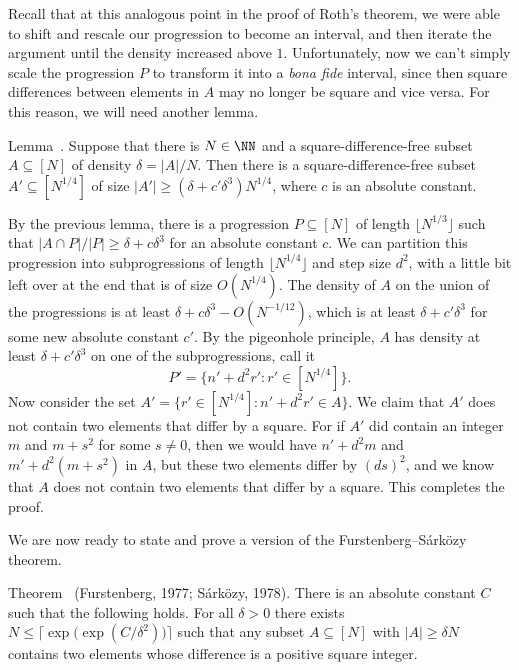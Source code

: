 Recall that at this analogous point in the proof of Roth's theorem, we were able to shift and
rescale our progression to become an interval, and then iterate the argument until the density
increased above $1$. Unfortunately,
now we can't simply scale the progression $P$ to transform it into a {\it bona fide} interval, since then
square differences between elements in $A$ may no longer be square and vice versa. For
this reason, we will need another lemma.

\edef\lemfurstenbergsarkozy{\the\thmcount}
\proclaim Lemma~\advthm.
Suppose that there is $N\in \NN$ and a square-difference-free
subset $A\subseteq [N]$ of density $\delta = |A|/N$. Then there is a square-difference-free
subset $A'\subseteq [N^{1/4}]$
of size $|A'| \ge (\delta + c'\delta^3) N^{1/4}$, where $c$ is an absolute constant.

\proof By the previous lemma, there is a progression $P\subseteq [N]$ of length $\lfloor N^{1/3}\rfloor$
such that $|A\cap P|/|P| \ge \delta + c\delta^3$ for an absolute
constant $c$. We can partition this progression into subprogressions of length $\lfloor N^{1/4}\rfloor$
and step size $d^2$, with a little bit left over at the end that is of size $O(N^{1/4})$. The density
of $A$ on the union of the progressions is at least $\delta + c\delta^3 - O(N^{-1/12})$,
which is at least $\delta + c'\delta^3$ for some new absolute constant $c'$. By the pigeonhole principle,
$A$ has density at least $\delta + c'\delta^3$ on one of the subprogressions, call it
$$P' = \bigl\{ n' + d^2r' : r'\in [N^{1/4}]\bigr\}.$$
Now consider the set $A' = \bigl\{ r'\in [N^{1/4}] : n' + d^2 r'\in A\bigr\}$. We claim that
$A'$ does not contain two elements that differ by a square. For if $A'$ did contain an integer $m$ and $m+s^2$
for some $s\ne 0$, then we would have $n' + d^2m$ and $m'+d^2(m+s^2)$ in
$A$, but these two elements differ by $(ds)^2$, and we know that $A$ does not contain two elements
that differ by a square. This completes the proof.\slug

We are now ready to state and prove a version of the Furstenberg--S\'ark\"ozy theorem.

\parenproclaim Theorem~{\advthm} (Furstenberg, {\rm 1977;} S\'ark\"ozy, {\rm 1978}).
There is an absolute constant $C$ such that the following holds.
For all $\delta > 0$ there exists $N \le \bigl\lceil \exp\bigl(\exp(C/\delta^2)\bigr)\bigr\rceil$ such that
any subset $A\subseteq [N]$
with $|A|\ge \delta N$ contains two elements whose difference is a positive square integer.

